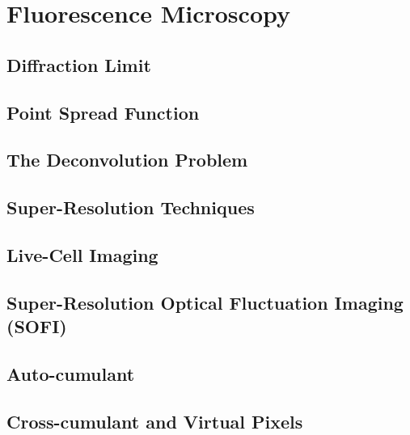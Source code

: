 \chapter{Fluorescence Microscopy}
\label{sec:fluorescence}

\section{Diffraction Limit}
\section{Point Spread Function}
\section{The Deconvolution Problem}
\section{Super-Resolution Techniques}
\section{Live-Cell Imaging}
\section{Super-Resolution Optical Fluctuation Imaging (SOFI)}
\label{sec:sofi_bg}

\section{Auto-cumulant}
\section{Cross-cumulant and Virtual Pixels}
